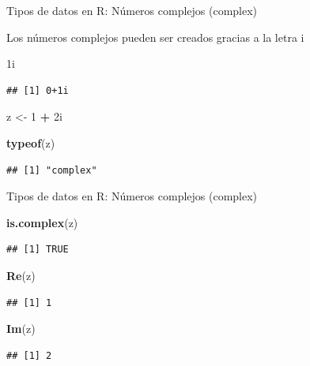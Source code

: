 \documentclass[ignorenonframetext,]{beamer}
\newenvironment{Shaded}{\begin{snugshade}}{\end{snugshade}}
\newcommand{\KeywordTok}[1]{\textcolor[rgb]{0.13,0.29,0.53}{\textbf{#1}}}
\newcommand{\DecValTok}[1]{\textcolor[rgb]{0.00,0.00,0.81}{#1}}
\newcommand{\StringTok}[1]{\textcolor[rgb]{0.31,0.60,0.02}{#1}}
\newcommand{\OperatorTok}[1]{\textcolor[rgb]{0.81,0.36,0.00}{\textbf{#1}}}
\newcommand{\NormalTok}[1]{#1}
\begin{document}
\begin{frame}[fragile]{Tipos de datos en R: Números complejos (complex)}

Los números complejos pueden ser creados gracias a la letra i

\begin{Shaded}
\begin{Highlighting}[]
\NormalTok{1i}
\end{Highlighting}
\end{Shaded}

\begin{verbatim}
## [1] 0+1i
\end{verbatim}

\begin{Shaded}
\begin{Highlighting}[]
\NormalTok{z <-}\StringTok{ }\DecValTok{1} \OperatorTok{+}\StringTok{ }\NormalTok{2i}
\end{Highlighting}
\end{Shaded}

\begin{Shaded}
\begin{Highlighting}[]
\KeywordTok{typeof}\NormalTok{(z)}
\end{Highlighting}
\end{Shaded}

\begin{verbatim}
## [1] "complex"
\end{verbatim}

\end{frame}

\begin{frame}[fragile]{Tipos de datos en R: Números complejos (complex)}

\begin{Shaded}
\begin{Highlighting}[]
\KeywordTok{is.complex}\NormalTok{(z)}
\end{Highlighting}
\end{Shaded}

\begin{verbatim}
## [1] TRUE
\end{verbatim}

\begin{Shaded}
\begin{Highlighting}[]
\KeywordTok{Re}\NormalTok{(z)}
\end{Highlighting}
\end{Shaded}

\begin{verbatim}
## [1] 1
\end{verbatim}

\begin{Shaded}
\begin{Highlighting}[]
\KeywordTok{Im}\NormalTok{(z)}
\end{Highlighting}
\end{Shaded}

\begin{verbatim}
## [1] 2
\end{verbatim}

\end{frame}
\end{document}
